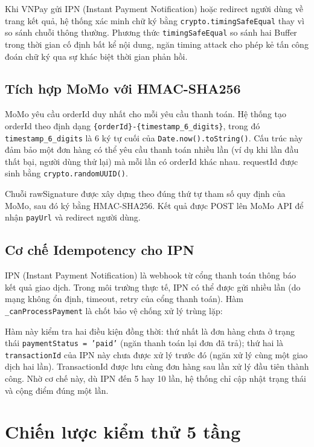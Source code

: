 Khi VNPay gửi IPN (Instant Payment Notification) hoặc redirect người dùng về trang kết quả, hệ thống xác minh chữ ký bằng \texttt{crypto.timingSafeEqual} thay vì so sánh chuỗi thông thường. Phương thức \texttt{timingSafeEqual} so sánh hai Buffer trong thời gian cố định bất kể nội dung, ngăn timing attack cho phép kẻ tấn công đoán chữ ký qua sự khác biệt thời gian phản hồi.

\subsection{Tích hợp MoMo với HMAC-SHA256}

MoMo yêu cầu orderId duy nhất cho mỗi yêu cầu thanh toán. Hệ thống tạo orderId theo định dạng \texttt{\{orderId\}-\{timestamp\_6\_digits\}}, trong đó \texttt{timestamp\_6\_digits} là 6 ký tự cuối của \texttt{Date.now().toString()}. Cấu trúc này đảm bảo một đơn hàng có thể yêu cầu thanh toán nhiều lần (ví dụ khi lần đầu thất bại, người dùng thử lại) mà mỗi lần có orderId khác nhau. requestId được sinh bằng \texttt{crypto.randomUUID()}.

Chuỗi rawSignature được xây dựng theo đúng thứ tự tham số quy định của MoMo, sau đó ký bằng HMAC-SHA256. Kết quả được POST lên MoMo API để nhận \texttt{payUrl} và redirect người dùng.

\subsection{Cơ chế Idempotency cho IPN}

IPN (Instant Payment Notification) là webhook từ cổng thanh toán thông báo kết quả giao dịch. Trong môi trường thực tế, IPN có thể được gửi nhiều lần (do mạng không ổn định, timeout, retry của cổng thanh toán). Hàm \texttt{\_canProcessPayment} là chốt bảo vệ chống xử lý trùng lặp:

Hàm này kiểm tra hai điều kiện đồng thời: thứ nhất là đơn hàng chưa ở trạng thái \texttt{paymentStatus = 'paid'} (ngăn thanh toán lại đơn đã trả); thứ hai là \texttt{transactionId} của IPN này chưa được xử lý trước đó (ngăn xử lý cùng một giao dịch hai lần). TransactionId được lưu cùng đơn hàng sau lần xử lý đầu tiên thành công. Nhờ cơ chế này, dù IPN đến 5 hay 10 lần, hệ thống chỉ cập nhật trạng thái và cộng điểm đúng một lần.

\section{Chiến lược kiểm thử 5 tầng}

